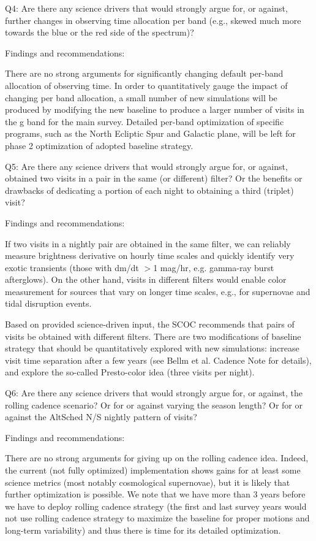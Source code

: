 Q4:  Are there any science drivers that would strongly argue for, or against, further changes
in observing time allocation per band (e.g., skewed much more towards the blue or the red 
side of the spectrum)?  

Findings and recommendations:

There are no strong arguments for significantly changing default per-band allocation of observing time. In order to quantitatively gauge the impact of changing per band allocation, a small number of new simulations will be produced by modifying the new baseline to produce a larger number of visits in the g band for the main survey. Detailed per-band optimization of specific programs, such as the North Ecliptic Spur and Galactic plane, will be left for phase 2 optimization of adopted baseline strategy. 


Q5:  Are there any science drivers that would strongly argue for, or against, obtained two 
visits in a pair in the same (or different) filter? Or the benefits or drawbacks of dedicating 
a portion of each night to obtaining a third (triplet) visit?    

Findings and recommendations:

If two visits in a nightly pair are obtained in the same filter, we can reliably measure brightness derivative on hourly time scales and quickly identify very exotic transients (those with dm/dt $> $1 mag/hr, e.g. gamma-ray burst afterglows). On the other hand, visits in different filters would enable color measurement for sources that vary on longer time scales, e.g., for supernovae and tidal disruption events. 

Based on provided science-driven input, the SCOC recommends that pairs of visits be obtained with different filters. There are two modifications of baseline strategy that should be quantitatively explored with new simulations: increase visit time separation after a few years (see Bellm et al. Cadence Note for details), and explore the so-called Presto-color idea (three visits per night). 

  
Q6:  Are there any science drivers that would strongly argue for, or against, the rolling cadence scenario? Or for or against varying the season length? Or for or against the AltSched N/S nightly pattern of visits? 

Findings and recommendations:

There are no strong arguments for giving up on the rolling cadence idea. Indeed, the current (not fully optimized) implementation shows gains for at least some science metrics (most notably cosmological supernovae), but it is likely that further optimization is possible. We note that we have more than 3 years before we have to deploy rolling cadence strategy (the first and last survey years would not use rolling cadence strategy to maximize the baseline for proper motions and long-term variability) and thus there is time for its detailed optimization. 

